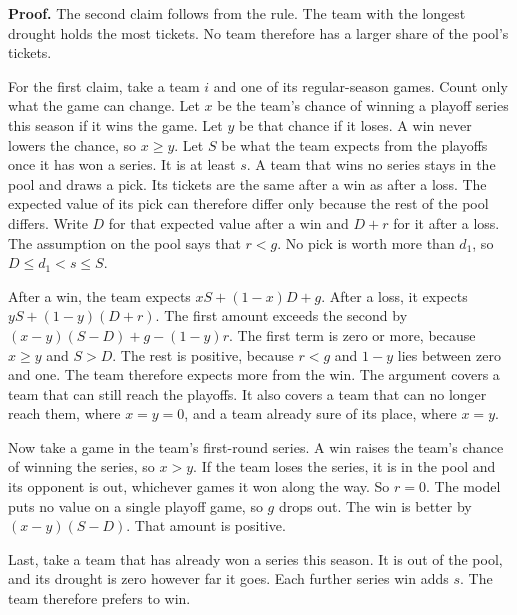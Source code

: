 \documentclass[11pt,letterpaper]{article}
\begin{document}
\textbf{Proof.} The second claim follows from the rule. The team with the longest drought holds the most tickets. No team therefore has a larger share of the pool's tickets.

For the first claim, take a team $i$ and one of its regular-season games. Count only what the game can change. Let $x$ be the team's chance of winning a playoff series this season if it wins the game. Let $y$ be that chance if it loses. A win never lowers the chance, so $x \ge y$. Let $S$ be what the team expects from the playoffs once it has won a series. It is at least $s$. A team that wins no series stays in the pool and draws a pick. Its tickets are the same after a win as after a loss. The expected value of its pick can therefore differ only because the rest of the pool differs. Write $D$ for that expected value after a win and $D + r$ for it after a loss. The assumption on the pool says that $r < g$. No pick is worth more than $d_1$, so $D \le d_1 < s \le S$.

After a win, the team expects $xS + (1 - x)D + g$. After a loss, it expects $yS + (1 - y)(D + r)$. The first amount exceeds the second by $(x - y)(S - D) + g - (1 - y)r$. The first term is zero or more, because $x \ge y$ and $S > D$. The rest is positive, because $r < g$ and $1 - y$ lies between zero and one. The team therefore expects more from the win. The argument covers a team that can still reach the playoffs. It also covers a team that can no longer reach them, where $x = y = 0$, and a team already sure of its place, where $x = y$.

Now take a game in the team's first-round series. A win raises the team's chance of winning the series, so $x > y$. If the team loses the series, it is in the pool and its opponent is out, whichever games it won along the way. So $r = 0$. The model puts no value on a single playoff game, so $g$ drops out. The win is better by $(x - y)(S - D)$. That amount is positive.

Last, take a team that has already won a series this season. It is out of the pool, and its drought is zero however far it goes. Each further series win adds $s$. The team therefore prefers to win.
\end{document}
